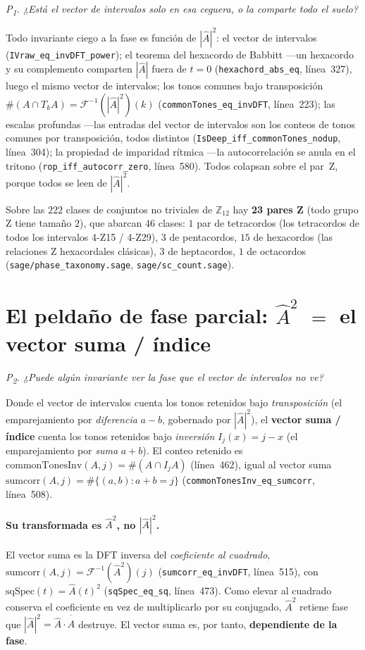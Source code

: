 \documentclass[11pt]{article}
\newcommand{\lean}[1]{\texttt{#1}}
\newcommand{\Ztwelve}{\mathbb{Z}_{12}}
\newcommand{\Ahat}{\hat{A}}
\newcommand{\Fi}{\mathcal{F}^{-1}}
\newcommand{\question}[1]{\smallskip\noindent\textit{#1}\smallskip}
\begin{document}
\question{P\textsubscript{1}. ¿Está el vector de intervalos solo en esa ceguera, o la comparte todo el suelo?}

Todo invariante ciego a la fase es función de $|\Ahat|^2$: el vector de intervalos
(\lean{IVraw\_eq\_invDFT\_power}); el teorema del hexacordo de Babbitt ---un hexacordo y su complemento
comparten $|\Ahat|$ fuera de $t=0$ (\lean{hexachord\_abs\_eq}, línea~327), luego el mismo vector de
intervalos; los tonos comunes bajo transposición $\#(A\cap T_kA)=\Fi(|\Ahat|^2)(k)$
(\lean{commonTones\_eq\_invDFT}, línea~223); las escalas profundas ---las entradas del vector de
intervalos son los conteos de tonos comunes por transposición, todos distintos
(\lean{IsDeep\_iff\_commonTones\_nodup}, línea~304); la propiedad de imparidad rítmica ---la
autocorrelación se anula en el tritono (\lean{rop\_iff\_autocorr\_zero}, línea~580). Todos colapsan sobre
el par~Z, porque todos se leen de $|\Ahat|^2$.

Sobre las $222$ clases de conjuntos no triviales de $\Ztwelve$ hay \textbf{23 pares Z} (todo grupo Z tiene
tamaño $2$), que abarcan $46$ clases: $1$ par de tetracordos (los tetracordos de todos los intervalos
4-Z15 / 4-Z29), $3$ de pentacordos, $15$ de hexacordos (las relaciones Z hexacordales clásicas), $3$ de
heptacordos, $1$ de octacordos (\lean{sage/phase\_taxonomy.sage}, \lean{sage/sc\_count.sage}).

\section{El peldaño de fase parcial: \texorpdfstring{$\Ahat^2$}{A^2} \texorpdfstring{$=$}{=} el vector suma / índice}\label{sec:partial}

\question{P\textsubscript{2}. ¿Puede algún invariante ver la fase que el vector de intervalos no ve?}

Donde el vector de intervalos cuenta los tonos retenidos bajo \emph{transposición} (el emparejamiento por
\emph{diferencia} $a-b$, gobernado por $|\Ahat|^2$), el \textbf{vector suma / índice} cuenta los tonos
retenidos bajo \emph{inversión} $I_j(x)=j-x$ (el emparejamiento por \emph{suma} $a+b$). El conteo retenido
es $\mathrm{commonTonesInv}(A,j)=\#(A\cap I_jA)$ (línea~462), igual al vector suma
$\mathrm{sumcorr}(A,j)=\#\{(a,b):a+b=j\}$ (\lean{commonTonesInv\_eq\_sumcorr}, línea~508).

\paragraph{Su transformada es $\Ahat^2$, no $|\Ahat|^2$.} El vector suma es la DFT inversa del
\emph{coeficiente al cuadrado}, $\mathrm{sumcorr}(A,j)=\Fi(\Ahat^2)(j)$ (\lean{sumcorr\_eq\_invDFT},
línea~515), con $\mathrm{sqSpec}(t)=\Ahat(t)^2$ (\lean{sqSpec\_eq\_sq}, línea~473). Como elevar al cuadrado
conserva el coeficiente en vez de multiplicarlo por su conjugado, $\Ahat^2$ retiene fase que
$|\Ahat|^2=\Ahat\cdot\overline{\Ahat}$ destruye. El vector suma es, por tanto, \textbf{dependiente de la
fase}.
\end{document}
